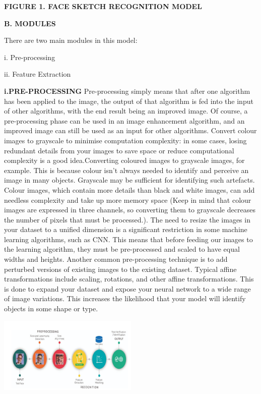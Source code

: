 \documentclass[journal]{IEEEtran} %
\begin{document}
\textbf\textbf{{FIGURE 1. FACE SKETCH RECOGNITION MODEL}
}

\vspace \textbf{\textbf{B. MODULES}}

There are two main modules in this model:

i.	Pre-processing

ii.	Feature Extraction

\textbf{i.PRE-PROCESSING}
Pre-processing simply means that after one algorithm has been applied to the image, the output of that algorithm is fed into the input of other algorithms, with the end result being an improved image. Of course, a pre-processing phase can be used in an image enhancement algorithm, and an improved image can still be used as an input for other algorithms.
Convert colour images to grayscale to minimise computation complexity: in some cases, losing redundant details from your images to save space or reduce computational complexity is a good idea.Converting coloured images to grayscale images, for example. This is because colour isn't always needed to identify and perceive an image in many objects. Grayscale may be sufficient for identifying such artefacts. Colour images, which contain more details than black and white images, can add needless complexity and take up more memory space (Keep in mind that colour images are expressed in three channels, so converting them to grayscale decreases the number of pixels that must be processed.).
The need to resize the images in your dataset to a unified dimension is a significant restriction in some machine learning algorithms, such as CNN. This means that before feeding our images to the learning algorithm, they must be pre-processed and scaled to have equal widths and heights.
Another common pre-processing technique is to add perturbed versions of existing images to the existing dataset. Typical affine transformations include scaling, rotations, and other affine transformations. This is done to expand your dataset and expose your neural network to a wide range of image variations. This increases the likelihood that your model will identify objects in some shape or type.

\includegraphics[width=0.5\textwidth]{module1.PNG}
\end{document}

